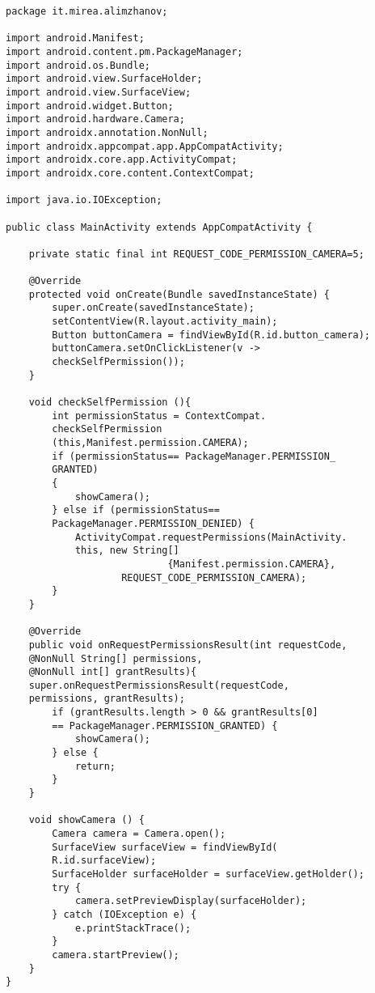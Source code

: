 \begin{verbatim}
package it.mirea.alimzhanov;

import android.Manifest;
import android.content.pm.PackageManager;
import android.os.Bundle;
import android.view.SurfaceHolder;
import android.view.SurfaceView;
import android.widget.Button;
import android.hardware.Camera;
import androidx.annotation.NonNull;
import androidx.appcompat.app.AppCompatActivity;
import androidx.core.app.ActivityCompat;
import androidx.core.content.ContextCompat;

import java.io.IOException;

public class MainActivity extends AppCompatActivity {

    private static final int REQUEST_CODE_PERMISSION_CAMERA=5;

    @Override
    protected void onCreate(Bundle savedInstanceState) {
        super.onCreate(savedInstanceState);
        setContentView(R.layout.activity_main);
        Button buttonCamera = findViewById(R.id.button_camera);
        buttonCamera.setOnClickListener(v ->
        checkSelfPermission());
    }

    void checkSelfPermission (){
        int permissionStatus = ContextCompat.
        checkSelfPermission
        (this,Manifest.permission.CAMERA);
        if (permissionStatus== PackageManager.PERMISSION_
        GRANTED)
        {
            showCamera();
        } else if (permissionStatus==
        PackageManager.PERMISSION_DENIED) {
            ActivityCompat.requestPermissions(MainActivity.
            this, new String[]
                            {Manifest.permission.CAMERA},
                    REQUEST_CODE_PERMISSION_CAMERA);
        }
    }

    @Override
    public void onRequestPermissionsResult(int requestCode,
    @NonNull String[] permissions, 
    @NonNull int[] grantResults){
    super.onRequestPermissionsResult(requestCode,
    permissions, grantResults);
        if (grantResults.length > 0 && grantResults[0]
        == PackageManager.PERMISSION_GRANTED) {
            showCamera();
        } else {
            return;
        }
    }

    void showCamera () {
        Camera camera = Camera.open();
        SurfaceView surfaceView = findViewById(
        R.id.surfaceView);
        SurfaceHolder surfaceHolder = surfaceView.getHolder();
        try {
            camera.setPreviewDisplay(surfaceHolder);
        } catch (IOException e) {
            e.printStackTrace();
        }
        camera.startPreview();
    }
}
\end{verbatim}
\newpage
